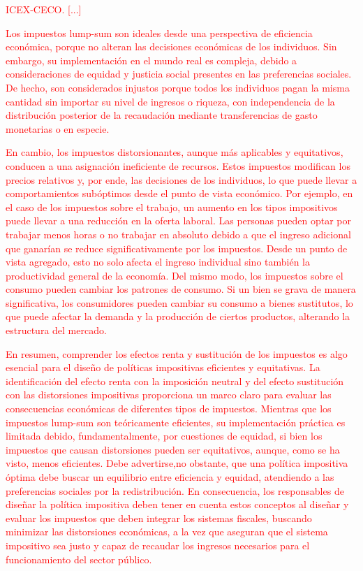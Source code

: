 \documentclass[10pt,a4paper]{article}
\begin{document}
\textcolor{red}{ICEX-CECO. [...]

Los impuestos lump-sum son ideales desde una perspectiva de eficiencia económica, porque no alteran las decisiones económicas de los individuos. Sin embargo, su implementación en el mundo real es compleja, debido a consideraciones de equidad y justicia social presentes en las preferencias sociales. De hecho, son considerados injustos porque todos los individuos pagan la misma cantidad sin importar su nivel de ingresos o riqueza, con independencia de la distribución posterior de la recaudación mediante transferencias de gasto monetarias o en especie.

En cambio, los impuestos distorsionantes, aunque más aplicables y equitativos, conducen a una asignación ineficiente de recursos. Estos impuestos modifican los precios relativos y, por ende, las decisiones de los individuos, lo que puede llevar a comportamientos subóptimos desde el punto de vista económico. Por ejemplo, en el caso de los impuestos sobre el trabajo, un aumento en los tipos impositivos puede llevar a una reducción en la oferta laboral. Las personas pueden optar por trabajar menos horas o no trabajar en absoluto debido a que el ingreso adicional que ganarían se reduce significativamente por los impuestos. Desde un punto de vista agregado, esto no solo afecta el ingreso individual sino también la productividad general de la economía. Del mismo modo, los impuestos sobre el consumo pueden cambiar los patrones de consumo. Si un bien se grava de manera significativa, los consumidores pueden cambiar su consumo a bienes sustitutos, lo que puede afectar la demanda y la producción de ciertos productos, alterando la estructura del mercado.

En resumen, comprender los efectos renta y sustitución de los impuestos es algo esencial para el diseño de políticas impositivas eficientes y equitativas. La identificación del efecto renta con la imposición neutral y del efecto sustitución con las distorsiones impositivas proporciona un marco claro para evaluar las consecuencias económicas de diferentes tipos de impuestos. Mientras que los impuestos lump-sum son teóricamente eficientes, su implementación práctica es limitada debido, fundamentalmente, por cuestiones de equidad, si bien los impuestos que causan distorsiones pueden ser equitativos, aunque, como se ha visto, menos eficientes. Debe advertirse,no obstante, que una política impositiva óptima debe buscar un equilibrio entre eficiencia y equidad, atendiendo a las preferencias sociales por la redistribución. En consecuencia, los responsables de diseñar la política impositiva deben tener en cuenta estos conceptos al diseñar y evaluar los impuestos que deben integrar los sistemas fiscales, buscando minimizar las distorsiones económicas, a la vez que aseguran que el sistema impositivo sea justo y capaz de recaudar los ingresos necesarios para el funcionamiento del sector público.}
\end{document}
